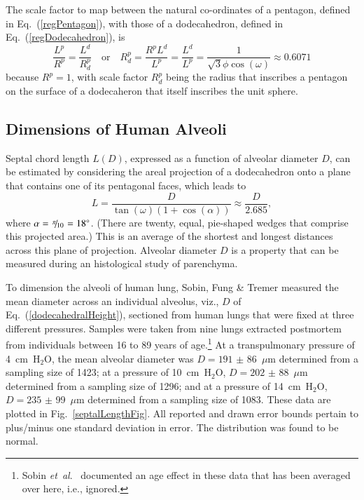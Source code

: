 The scale factor to map between the natural co-ordinates of a pentagon, defined in Eq.~(\ref{regPentagon}), with those of a dodecahedron, defined in Eq.~(\ref{regDodecahedron}), is
\begin{equation}
	\frac{L^{\!p}}{R^p} = \frac{L^{\!d}}{R^p_d} 
	\quad \text{or} \quad
	R^p_d = \frac{R^p L^{\!d}}{L^{\!p}} = \frac{L^{\!d}}{L^{\!p}} = 
	\frac{1}{\sqrt{3} \phi \cos (\omega)} \approx 0.6071
	\label{scaleFactor}
\end{equation}
because $R^p = 1$, with scale factor $R^p_d$ being the radius that inscribes a pentagon on the surface of a dodecaheron that itself inscribes the unit sphere.

\subsection{Dimensions of Human Alveoli}
\label{alveolarSize}

Septal chord length $L(D)$, expressed as a function of alveolar diameter $D$, can be estimated by considering the areal projection of a dodecahedron onto a plane that contains one of its pentagonal faces, which leads to
\begin{equation}
	L = \frac{D}{\tan ( \omega ) ( 1 + \cos ( \alpha ) )} 
	\approx  \frac{D}{2.685} ,
\label{dodecahedralHeight}
\end{equation} 
where $\alpha = \textfrac{\pi}{10} = 18^{\circ}$.  (There are twenty, equal, pie-shaped wedges that comprise this projected area.)  This is an average of the shortest and longest distances across this plane of projection.  Alveolar diameter $D$ is a property that can be measured during an histological study of parenchyma.  

To dimension the alveoli of human lung, Sobin, Fung \& Tremer \cite{Sobinetal88} measured the mean diameter across an individual alveolus, viz., $D$ of Eq.~(\ref{dodecahedralHeight}),  sectioned from human lungs that were fixed at three different pressures.  Samples were taken from nine lungs extracted postmortem from individuals between 16 to 89 years of age.\footnote{%
	Sobin \textit{et~al}.\ \cite{Sobinetal88} documented an age effect in these data that has been averaged over here, i.e., ignored.
}
At a transpulmonary pressure of 4~cm~$\text{H}_2$O, the mean alveolar diameter was $D = 191$ $\pm$ 86~$\mu$m determined from a sampling size of 1423; at a pressure of 10~cm~$\text{H}_2$O, $D = 202$ $\pm$ 88~$\mu$m determined from a sampling size of 1296; and at a pressure of 14~cm~$\text{H}_2$O, $D = 235$ $\pm$ 99~$\mu$m determined from a sampling size of 1083.  These data are plotted in Fig.~\ref{septalLengthFig}.  All reported and drawn error bounds pertain to plus\slash minus one standard deviation in error.  The distribution was found to be normal.

